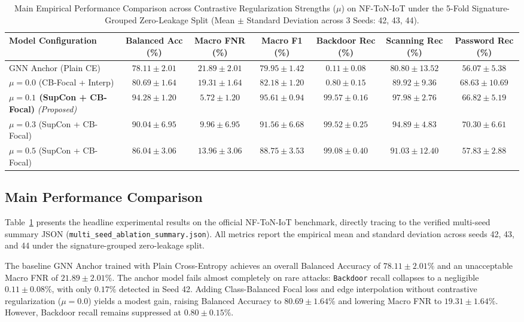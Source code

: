 \documentclass[journal,onecolumn]{IEEEtran}
\begin{document}
\begin{table}[!t]
\centering
\caption{Main Empirical Performance Comparison across Contrastive Regularization Strengths ($\mu$) on NF-ToN-IoT under the 5-Fold Signature-Grouped Zero-Leakage Split (Mean $\pm$ Standard Deviation across 3 Seeds: 42, 43, 44).}
\label{tab:main_results}
\small
\begin{tabular}{lcccccc}
\toprule
\textbf{Model Configuration} & \textbf{Balanced Acc (\%)} & \textbf{Macro FNR (\%)} & \textbf{Macro F1 (\%)} & \textbf{Backdoor Rec (\%)} & \textbf{Scanning Rec (\%)} & \textbf{Password Rec (\%)} \\
\midrule
GNN Anchor (Plain CE) & $78.11 \pm 2.01$ & $21.89 \pm 2.01$ & $79.95 \pm 1.42$ & $0.11 \pm 0.08$ & $80.80 \pm 13.52$ & $56.07 \pm 5.38$ \\
$\mu = 0.0$ (CB-Focal + Interp) & $80.69 \pm 1.64$ & $19.31 \pm 1.64$ & $82.18 \pm 1.20$ & $0.80 \pm 0.15$ & $89.92 \pm 9.36$ & $68.63 \pm 10.69$ \\
\textbf{$\mu = 0.1$ (SupCon + CB-Focal)} \emph{(Proposed)} & $\mathbf{94.28 \pm 1.20}$ & $\mathbf{5.72 \pm 1.20}$ & $\mathbf{95.61 \pm 0.94}$ & $\mathbf{99.57 \pm 0.16}$ & $\mathbf{97.98 \pm 2.76}$ & $66.82 \pm 5.19$ \\
$\mu = 0.3$ (SupCon + CB-Focal) & $90.04 \pm 6.95$ & $9.96 \pm 6.95$ & $91.56 \pm 6.68$ & $99.52 \pm 0.25$ & $94.89 \pm 4.83$ & $\mathbf{70.30 \pm 6.61}$ \\
$\mu = 0.5$ (SupCon + CB-Focal) & $86.04 \pm 3.06$ & $13.96 \pm 3.06$ & $88.75 \pm 3.53$ & $99.08 \pm 0.40$ & $91.03 \pm 12.40$ & $57.83 \pm 2.88$ \\
\bottomrule
\end{tabular}
\end{table}

\subsection{Main Performance Comparison}
Table~\ref{tab:main_results} presents the headline experimental results on the official NF-ToN-IoT benchmark, directly tracing to the verified multi-seed summary JSON (\texttt{multi\_seed\_ablation\_summary.json}). All metrics report the empirical mean and standard deviation across seeds 42, 43, and 44 under the signature-grouped zero-leakage split.

The baseline GNN Anchor trained with Plain Cross-Entropy achieves an overall Balanced Accuracy of $78.11 \pm 2.01\%$ and an unacceptable Macro FNR of $21.89 \pm 2.01\%$. The anchor model fails almost completely on rare attacks: \texttt{Backdoor} recall collapses to a negligible $0.11 \pm 0.08\%$, with only $0.17\%$ detected in Seed 42. Adding Class-Balanced Focal loss and edge interpolation without contrastive regularization ($\mu = 0.0$) yields a modest gain, raising Balanced Accuracy to $80.69 \pm 1.64\%$ and lowering Macro FNR to $19.31 \pm 1.64\%$. However, Backdoor recall remains suppressed at $0.80 \pm 0.15\%$.
\end{document}
